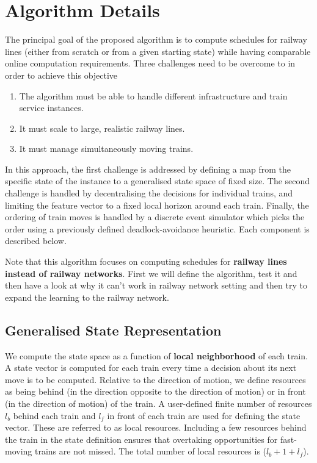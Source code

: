 \chapter{Algorithm Details}

The principal goal of the proposed algorithm is to compute
schedules for railway lines (either from scratch or from a given
starting state) while having comparable online computation requirements. 
Three challenges need to be overcome
to in order to achieve this objective

\begin{enumerate}
\item The algorithm must be able to handle different infrastructure and train service instances. 
\item It must scale to large, realistic railway lines.
\item It must manage simultaneously moving trains.
\end{enumerate}
In this approach, the first challenge is addressed by defining a map
from the specific state of the instance to a generalised state
space of fixed size. The second challenge is handled by
decentralising the decisions for individual trains, and limiting
the feature vector to a fixed local horizon around each
train. Finally, the ordering of train moves is handled by
a discrete event simulator which picks the order using a
previously defined deadlock-avoidance heuristic. Each
component is described below.

\vspace{\baselineskip}
Note that this algorithm focuses on computing schedules for \textbf{railway lines instead of railway networks}.
First we will define the algorithm, test it and then have a look at why it can't work in 
railway network setting and then try to expand the learning to the railway network.

\section{Generalised State Representation}
We compute the state space as a function of \textbf{local neighborhood} of each
train.
A state vector is computed for each train every time a
decision about its next move is to be computed. Relative to
the direction of motion, we define resources as being behind
(in the direction opposite to the direction of motion) or in
front (in the direction of motion) of the train. A user-defined
finite number of resources $ l_b $ behind each train and $ l_f $ in
front of each train are used for defining the state vector. These
are referred to as local resources. Including a few resources
behind the train in the state definition ensures that overtaking
opportunities for fast-moving trains are not missed. The total
number of local resources is ($ l_b + 1 + l_f $). 

